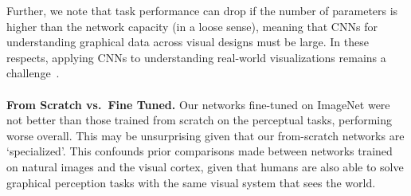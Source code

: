 {Further, we note that task performance can drop if the number of parameters is higher than the network capacity (in a loose sense), meaning that CNNs for understanding graphical data across visual designs must be large. In these respects, applying CNNs to understanding real-world visualizations remains a challenge~\cite{Kahou2018}.
%
%
%
\\~\\
\noindent \textbf{From Scratch vs.~Fine Tuned.} Our networks fine-tuned on ImageNet were not better than those trained from scratch on the perceptual tasks, performing worse overall. This may be unsurprising given that our from-scratch networks are `specialized'. This confounds prior comparisons made between networks trained on natural images and the visual cortex, given that humans are also able to solve graphical perception tasks with the same visual system that sees the world. %
}

